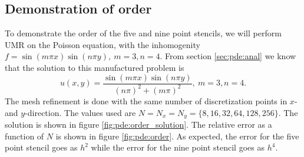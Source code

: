 \subsection{Demonstration of order}
To demonstrate the order of the five and nine point stencils, we will perform UMR on the Poisson equation, with the inhomogenity $f = \sin(m \pi x)\sin(n \pi y), ~m=3, n=4$.
From section \ref{sec:pde:anal} we know that the solution to this manufactured problem is
$$
u(x, y) =
\frac{
  \sin(m \pi x)\sin(n \pi y)
}{
  (n\pi)^2 + (m\pi)^2
}
, ~m=3, n=4.
$$
The mesh refinement is done with the same number of discretization points in $x$- and $y$-direction.
The values used are $N = N_x = N_y = \{8, 16, 32, 64, 128, 256\}$.
The solution is shown in figure \ref{fig:pde:order_solution}.
The relative error as a function of $N$ is shown in figure \ref{fig:pde:order}.
As expected, the error for the five point stencil goes as $h^2$ while the error for the nine point stencil goes as $h^4$.


